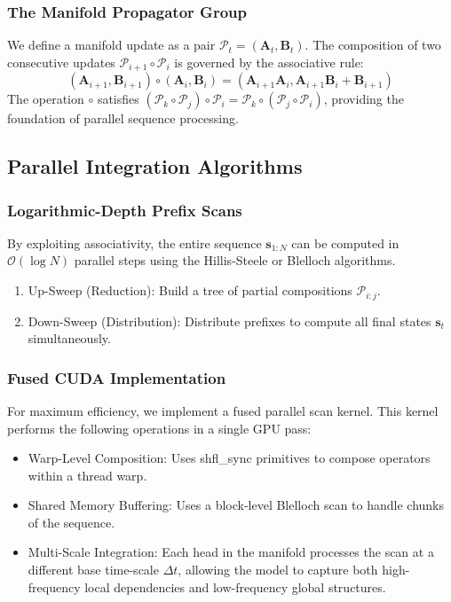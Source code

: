 \documentclass{article}
\numberwithin{equation}{section}
\begin{document}
\subsubsection{The Manifold Propagator Group}
We define a manifold update as a pair $\mathcal{P}_t = (\mathbf{A}_t, \mathbf{B}_t)$. The composition of two consecutive updates $\mathcal{P}_{i+1} \circ \mathcal{P}_i$ is governed by the associative rule:
\[
(\mathbf{A}_{i+1}, \mathbf{B}_{i+1}) \circ (\mathbf{A}_i, \mathbf{B}_i) = (\mathbf{A}_{i+1} \mathbf{A}_i, \mathbf{A}_{i+1} \mathbf{B}_i + \mathbf{B}_{i+1})
\]
The operation $\circ$ satisfies $(\mathcal{P}_k \circ \mathcal{P}_j) \circ \mathcal{P}_i = \mathcal{P}_k \circ (\mathcal{P}_j \circ \mathcal{P}_i)$, providing the foundation of parallel sequence processing.

\subsection{Parallel Integration Algorithms}
\subsubsection{Logarithmic-Depth Prefix Scans}
By exploiting associativity, the entire sequence $\mathbf{s}_{1:N}$ can be computed in $\mathcal{O}(\log N)$ parallel steps using the Hillis-Steele or Blelloch algorithms.
\begin{enumerate}
\item Up-Sweep (Reduction): Build a tree of partial compositions $\mathcal{P}_{i:j}$.
\item Down-Sweep (Distribution): Distribute prefixes to compute all final states $\mathbf{s}_t$ simultaneously.
\end{enumerate}

\subsubsection{Fused CUDA Implementation}
For maximum efficiency, we implement a fused parallel scan kernel. This kernel performs the following operations in a single GPU pass:
\begin{itemize}
\item Warp-Level Composition: Uses shfl\_sync primitives to compose operators within a thread warp.
\item Shared Memory Buffering: Uses a block-level Blelloch scan to handle chunks of the sequence.
\item Multi-Scale Integration: Each head in the manifold processes the scan at a different base time-scale $\Delta t$, allowing the model to capture both high-frequency local dependencies and low-frequency global structures.
\end{itemize}
\end{document}
